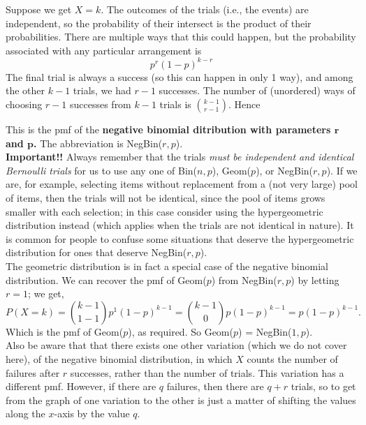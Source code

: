 \noindent Suppose we get $X = k$.  The outcomes of the trials (i.e., the events) are independent, so the probability of their intersect is the product of their probabilities. There are multiple ways that this could happen, but the probability associated with any particular arrangement is
\[
p^r(1-p)^{k-r}
\]
\noindent The final trial is always a success (so this can happen in only 1 way), and among the other $k-1$ trials, we had $r - 1$ successes. The number of (unordered) ways of choosing $r-1$ successes from $k-1$ trials is $\binom{k-1}{r-1}$. Hence

  	\bigskip
	
	\hfil{}
	\bigskip
	\bigskip

\noindent This is the pmf of the \textbf{negative binomial ditribution with parameters $\boldsymbol{r}$ and $\boldsymbol{p}$.} The abbreviation is NegBin($r,p$). \\ 

\noindent \textbf{Important!!} Always remember that the trials \textit{must be independent and identical Bernoulli trials} for us to use any one of Bin($n,p$), Geom($p$), or NegBin($r,p$). If we are, for example, selecting items without replacement from a (not very large) pool of items, then the trials will not be identical, since the pool of items grows smaller with each selection; in this case consider using the hypergeometric distribution instead (which applies when the trials are not identical in nature). It is common for people to confuse some situations that deserve the hypergeometric distribution for ones that deserve NegBin($r,p$). \\

\noindent The geometric distribution is in fact a special case of the negative binomial distribution. We can recover the pmf of Geom($p$) from NegBin($r,p$) by letting $r = 1$; we get,
\[
P(X = k) = \binom{k-1}{1-1}p^1(1-p)^{k-1} = \binom{k-1}{0}p(1-p)^{k-1} = p(1-p)^{k-1}.
\]
Which is the pmf of Geom($p$), as required. So Geom($p$) = NegBin($1,p$). \\

\noindent Also be aware that that there exists one other variation (which we do not cover here), of the negative binomial distribution, in which $X$ counts the number of failures after $r$ successes, rather than the number of trials. This variation has a different pmf. However, if there are $q$ failures, then there are $q+r$ trials, so to get from the graph of one variation to the other is just a matter of shifting the values along the $x$-axis by the value $q$. \\ 


